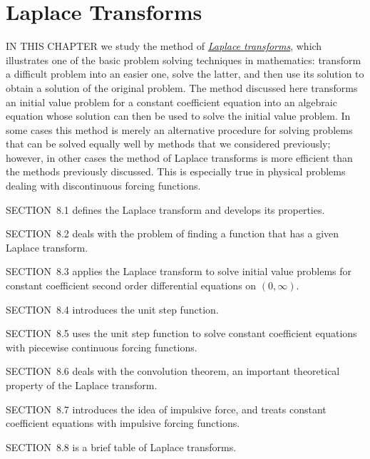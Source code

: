 \chapter{Laplace Transforms}

\noindent
IN THIS CHAPTER we study the method of
\href{https://mathshistory.st-andrews.ac.uk/Biographies/Laplace/}{\color{blue}
\it Laplace transforms}, which illustrates one of the basic problem solving techniques in mathematics: transform a difficult problem into an easier one, solve the latter, and then use its solution to obtain a solution of the original problem. The method discussed here transforms an initial value problem for a constant coefficient equation into an algebraic equation whose solution can then be used to solve the initial value problem. In some cases this method is merely an alternative procedure for solving problems that can be solved equally well by methods that we considered previously; however, in other cases the method of Laplace transforms is more efficient than the methods previously discussed. This is especially true in physical problems dealing with discontinuous forcing functions.

\medskip
\noindent
SECTION~8.1 defines the Laplace transform and develops its properties.

\medskip
\noindent
SECTION~8.2 deals with the problem of finding a function that has a given Laplace transform.

\medskip
\noindent
SECTION~8.3 applies the Laplace transform to solve initial value problems for constant coefficient second order differential equations on $(0,\infty)$.

\medskip
\noindent
SECTION~8.4 introduces the unit step function.

\medskip
\noindent
SECTION~8.5 uses the unit step function to solve constant coefficient equations with piecewise continuous forcing functions.

\medskip
\noindent
SECTION~8.6 deals with the convolution theorem, an important theoretical property of the Laplace transform.

\medskip
\noindent
SECTION~8.7 introduces the idea of impulsive force, and treats constant coefficient equations with impulsive forcing functions.

\medskip
\noindent
SECTION~8.8 is a brief table of Laplace transforms.

\vspace*{2in}
\newpage
















